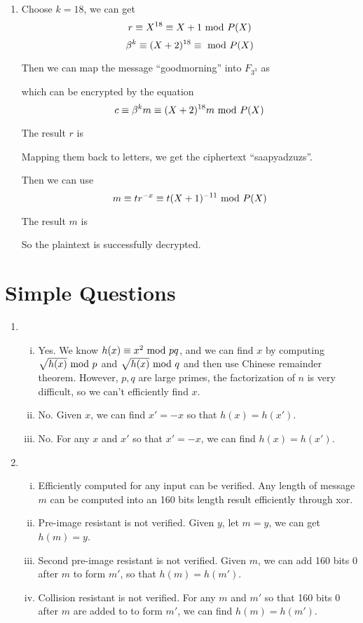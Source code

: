 \documentclass{article}
\renewcommand{\mod}{{\rm\ mod\ }}
\begin{document}
\begin{enumerate}
\item
Choose $k=18$, we can get 
$$r \equiv X^{18} \equiv X+1 \mod P(X)$$
$$\beta^k \equiv (X+2)^{18} \equiv \mod P(X) $$

Then we can map the message ``goodmorning'' into $F_{3^3}$ as


which can be encrypted by the equation
$$c \equiv \beta^k m \equiv (X+2)^{18} m \mod P(X) $$

The result $r$ is


Mapping them back to letters, we get the ciphertext ``saapyadzuzs''.

Then we can use $$m\equiv tr^{-x} \equiv t(X+1)^{-11} \mod P(X)$$

The result $m$ is


So the plaintext is successfully decrypted.
\end{enumerate}

\section{Simple Questions}
\begin{enumerate}
\item
\begin{enumerate}[(i)]
\item Yes. We know $h(x)\equiv x^2 \mod pq$, and we can find $x$ by computing $\sqrt{h(x)}\mod p$ and $\sqrt{h(x)}\mod q$ and then use Chinese remainder theorem. However, $p,q$ are large primes, the factorization of $n$ is very difficult, so we can't efficiently find $x$.
\item No. Given $x$, we can find $x'=-x$ so that $h(x)=h(x')$.
\item No. For any $x$ and $x'$ so that $x'=-x$, we can find $h(x)=h(x')$.
\end{enumerate}
\item
\begin{enumerate}[(i)]
\item Efficiently computed for any input can be verified. Any length of message $m$ can be computed into an 160 bits length result efficiently through xor.
\item Pre-image resistant is not verified. Given $y$, let $m=y$, we can get $h(m)=y$. 
\item Second pre-image resistant is not verified. Given $m$, we can add 160 bits 0 after $m$ to form $m'$, so that $h(m)=h(m')$.
\item Collision resistant is not verified. For any $m$ and $m'$ so that 160 bits 0 after $m$ are added to to form $m'$, we can find $h(m)=h(m')$.
\end{enumerate}
\end{enumerate}
\end{document}

